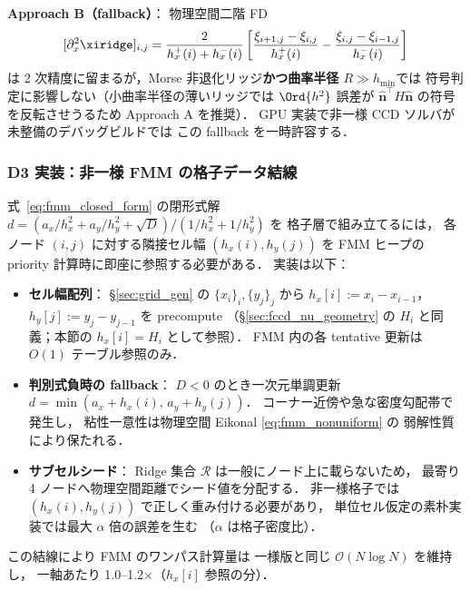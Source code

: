 \noindent\textbf{Approach B（fallback）}：
物理空間二階 FD
\[
  [\partial_x^2\xiridge]_{i,j}
  = \frac{2}{h_x^+(i)+h_x^-(i)}
    \left[\frac{\xi_{i+1,j}-\xi_{i,j}}{h_x^+(i)}
          - \frac{\xi_{i,j}-\xi_{i-1,j}}{h_x^-(i)}\right]
\]
は 2 次精度に留まるが，Morse 非退化リッジ\textbf{かつ曲率半径 $R \gg h_\text{min}$}では
符号判定に影響しない（小曲率半径の薄いリッジでは $\Ord{h^2}$ 誤差が
$\hat{\bm{n}}^{\!\top}H\hat{\bm{n}}$ の符号を反転させうるため Approach A を推奨）．
GPU 実装で非一様 CCD ソルバが未整備のデバッグビルドでは
この fallback を一時許容する．

\subsubsection{D3 実装：非一様 FMM の格子データ結線}
\label{sec:ridge_nu_fmm_impl}

式~\eqref{eq:fmm_closed_form} の閉形式解
$d = (a_x/h_x^2 + a_y/h_y^2 + \sqrt{D})/(1/h_x^2 + 1/h_y^2)$ を
格子層で組み立てるには，
各ノード $(i,j)$ に対する隣接セル幅 $(h_x(i), h_y(j))$ を
FMM ヒープの priority 計算時に即座に参照する必要がある．
実装は以下：
\begin{itemize}
  \item \textbf{セル幅配列}：
        \S\ref{sec:grid_gen} の $\{x_i\}_i, \{y_j\}_j$ から
        $h_x[i] := x_i - x_{i-1}$，$h_y[j] := y_j - y_{j-1}$ を precompute
        （\S\ref{sec:fccd_nu_geometry} の $H_i$ と同義；本節の $h_x[i] = H_i$ として参照）．
        FMM 内の各 tentative 更新は $O(1)$ テーブル参照のみ．
  \item \textbf{判別式負時の fallback}：
        $D<0$ のとき一次元単調更新
        $d = \min(a_x + h_x(i),\,a_y + h_y(j))$．
        コーナー近傍や急な密度勾配帯で発生し，
        粘性一意性は物理空間 Eikonal \eqref{eq:fmm_nonuniform} の
        弱解性質により保たれる．
  \item \textbf{サブセルシード}：
        Ridge 集合 $\mathcal{R}$ は一般にノード上に載らないため，
        最寄り 4 ノードへ物理空間距離でシード値を分配する．
        非一様格子では $(h_x(i),h_y(j))$ で正しく重み付ける必要があり，
        単位セル仮定の素朴実装では最大 $\alpha$ 倍の誤差を生む
        （$\alpha$ は格子密度比）．
\end{itemize}

\noindent この結線により FMM のワンパス計算量は
一様版と同じ $\mathcal{O}(N \log N)$ を維持し，
一軸あたり 1.0--1.2$\times$（$h_x[i]$ 参照の分）．

